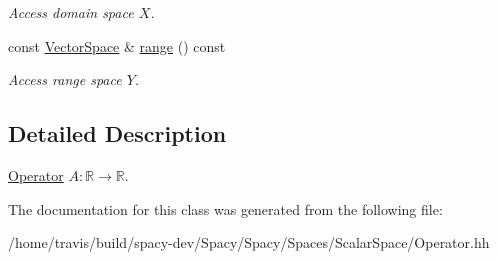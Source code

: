 \begin{DoxyCompactItemize}
\begin{DoxyCompactList}\small\item\em Access domain space $X$. \end{DoxyCompactList}\item 
\hypertarget{classSpacy_1_1OperatorBase_ab19d3b7a6f290b1079248f1e567e53d6}{const \hyperlink{classSpacy_1_1VectorSpace}{Vector\-Space} \& \hyperlink{classSpacy_1_1OperatorBase_ab19d3b7a6f290b1079248f1e567e53d6}{range} () const }\label{classSpacy_1_1OperatorBase_ab19d3b7a6f290b1079248f1e567e53d6}

\begin{DoxyCompactList}\small\item\em Access range space $Y$. \end{DoxyCompactList}\end{DoxyCompactItemize}


\subsection{Detailed Description}
\hyperlink{classSpacy_1_1Scalar_1_1Operator}{Operator} $A:\mathbb{R}\rightarrow\mathbb{R}$. 

The documentation for this class was generated from the following file\-:\begin{DoxyCompactItemize}
\item 
/home/travis/build/spacy-\/dev/\-Spacy/\-Spacy/\-Spaces/\-Scalar\-Space/Operator.\-hh\end{DoxyCompactItemize}
